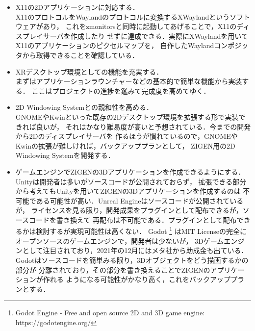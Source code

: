 \begin{itemize}
      \item X11の2Dアプリケーションに対応する．\\
            X11のプロトコルをWaylandのプロトコルに変換するXWaylandというソフトウェアがあり，
            これをzmonitorsと同時に起動してあげることで，X11のディスプレイサーバを作成したり
            せずに達成できる．実際にXWaylandを用いてX11のアプリケーションのピクセルマップを，
            自作したWaylandコンポジッタから取得できることを確認している．

      \item XRデスクトップ環境としての機能を充実する．\\
            まずはアプリケーションラウンチャーなどの基本的で簡単な機能から実装する．
            ここはプロジェクトの進捗を鑑みて完成度を高めてゆく．

      \item 2D Windowing Systemとの親和性を高める．\\
            GNOMEやKwinといった既存の2Dデスクトップ環境を拡張する形で実装できれば良いが，
            それはかなり難易度が高いと予想されている．今までの開発から2Dのディスプレイサーバを
            作るほうが慣れているので，GNOMEやKwinの拡張が難しければ，バックアッププランとして，
            ZIGEN用の2D Windowing Systemを開発する．

      \item ゲームエンジンでZIGENの3Dアプリケーションを作成できるようにする．\\
            Unityは開発者は多いがソースコードが公開されておらず，
            拡張できる部分から考えてもUnityを用いてZIGENの3Dアプリケーションを作成するのは
            不可能である可能性が高い．Unreal Engineはソースコードが公開されているが，
            ライセンスを見る限り，開発成果をプラグインとして配布できるが，ソースコードを書き換えて
            再配布は不可能である．プラグインとして配布できるかは検討するが実現可能性は高くない．
            Godot
            \footnote{Godot Engine - Free and open source 2D and 3D game engine: https://godotengine.org/}
            はMIT Licenseの完全にオープンソースのゲームエンジンで，開発者は少ないが，
            3Dゲームエンジンとして注目されており，2021年の12月にはメタ社から助成金も出ている．
            Godotはソースコードを簡単みる限り，3Dオブジェクトをどう描画するかの部分が
            分離されており，その部分を書き換えることでZIGENのアプリケーションが作れる
            ようになる可能性がかなり高く，これをバックアッププランとする．


\end{itemize}
